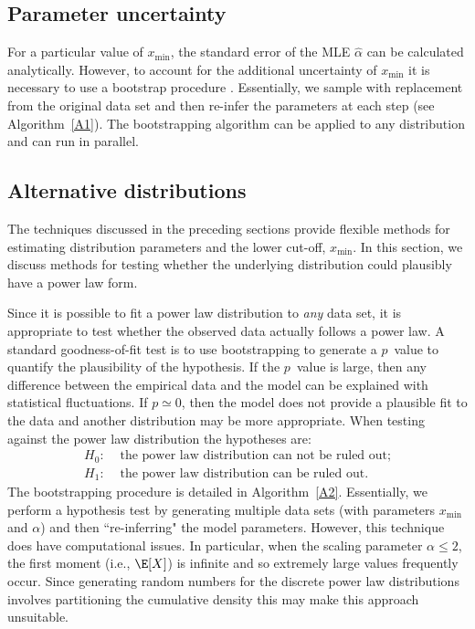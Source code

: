 \documentclass[article]{jss}
\newcommand{\xmin}{x_{\min}}
\begin{document}
\subsection{Parameter uncertainty}\label{2.3}

For a particular value of $\xmin$, the standard error of the MLE $\hat
\alpha$ can be calculated analytically. However, to account for the
additional uncertainty of $\xmin$ it is necessary to use a bootstrap
procedure \citep{Efron1993}. Essentially, we sample with replacement
from the original data set and then re-infer the parameters at each
step (see Algorithm~\ref{A1}). The bootstrapping algorithm can be
applied to any distribution and can run in parallel.

\subsection{Alternative distributions}

The techniques discussed in the preceding sections provide flexible methods for
estimating distribution parameters and the lower cut-off, $\xmin$. In this
section, we discuss methods for testing whether the underlying distribution
could plausibly have a power law form.

Since it is possible to fit a power law distribution to \textit{any}
data set, it is appropriate to test whether the observed data actually
follows a power law. A standard goodness-of-fit test is to use
bootstrapping to generate a $p$~value to quantify the plausibility of
the hypothesis. If the $p$~value is large, then any difference between
the empirical data and the model can be explained with statistical
fluctuations. If $p \simeq 0$, then the model does not provide a
plausible fit to the data and another distribution may be more
appropriate. When testing against the power law distribution the
hypotheses are:
\begin{align*}
H_0\!\!:& \text{ the power law distribution can not be ruled out;}\\
H_1\!\!:& \text{ the power law distribution can be ruled out.}
\end{align*}
The bootstrapping procedure is detailed in
Algorithm~\ref{A2}. Essentially, we perform a hypothesis test by
generating multiple data sets (with parameters $\xmin$ and $\alpha$)
and then ``re-inferring" the model parameters. However, this technique
does have computational issues. In particular, when the scaling
parameter $\alpha \le 2$, the first moment (i.e., $\E[X]$) is infinite
and so extremely large values frequently occur. Since generating
random numbers for the discrete power law distributions involves
partitioning the cumulative density this may make this approach
unsuitable.
\end{document}
